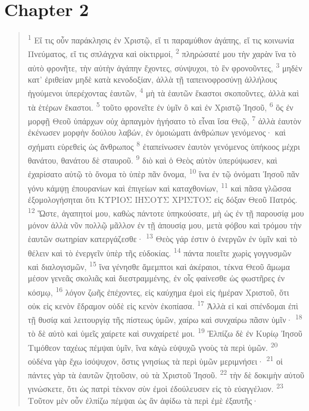 \documentclass{article}
\begin{document}
\section*{Chapter 2}
\begin{verse}
\textsuperscript{1} Εἴ τις οὖν παράκλησις ἐν Χριστῷ, εἴ τι παραμύθιον ἀγάπης, εἴ τις κοινωνία Πνεύματος, εἴ τις σπλάγχνα καὶ οἰκτιρμοί,
\textsuperscript{2} πληρώσατέ μου τὴν χαρὰν ἵνα τὸ αὐτὸ φρονῆτε, τὴν αὐτὴν ἀγάπην ἔχοντες, σύνψυχοι, τὸ ἓν φρονοῦντες,
\textsuperscript{3} μηδὲν κατ’ ἐριθείαν μηδὲ κατὰ κενοδοξίαν, ἀλλὰ τῇ ταπεινοφροσύνῃ ἀλλήλους ἡγούμενοι ὑπερέχοντας ἑαυτῶν,
\textsuperscript{4} μὴ τὰ ἑαυτῶν ἕκαστοι σκοποῦντες, ἀλλὰ καὶ τὰ ἑτέρων ἕκαστοι.
\textsuperscript{5} τοῦτο φρονεῖτε ἐν ὑμῖν ὃ καὶ ἐν Χριστῷ Ἰησοῦ,
\textsuperscript{6} ὃς ἐν μορφῇ Θεοῦ ὑπάρχων οὐχ ἁρπαγμὸν ἡγήσατο τὸ εἶναι ἴσα Θεῷ,
\textsuperscript{7} ἀλλὰ ἑαυτὸν ἐκένωσεν μορφὴν δούλου λαβών, ἐν ὁμοιώματι ἀνθρώπων γενόμενος· καὶ σχήματι εὑρεθεὶς ὡς ἄνθρωπος
\textsuperscript{8} ἐταπείνωσεν ἑαυτὸν γενόμενος ὑπήκοος μέχρι θανάτου, θανάτου δὲ σταυροῦ.
\textsuperscript{9} διὸ καὶ ὁ Θεὸς αὐτὸν ὑπερύψωσεν, καὶ ἐχαρίσατο αὐτῷ τὸ ὄνομα τὸ ὑπὲρ πᾶν ὄνομα,
\textsuperscript{10} ἵνα ἐν τῷ ὀνόματι Ἰησοῦ πᾶν γόνυ κάμψῃ ἐπουρανίων καὶ ἐπιγείων καὶ καταχθονίων,
\textsuperscript{11} καὶ πᾶσα γλῶσσα ἐξομολογήσηται ὅτι ΚΥΡΙΟΣ ΙΗΣΟΥΣ ΧΡΙΣΤΟΣ εἰς δόξαν Θεοῦ Πατρός.
\textsuperscript{12} Ὥστε, ἀγαπητοί μου, καθὼς πάντοτε ὑπηκούσατε, μὴ ὡς ἐν τῇ παρουσίᾳ μου μόνον ἀλλὰ νῦν πολλῷ μᾶλλον ἐν τῇ ἀπουσίᾳ μου, μετὰ φόβου καὶ τρόμου τὴν ἑαυτῶν σωτηρίαν κατεργάζεσθε·
\textsuperscript{13} Θεὸς γάρ ἐστιν ὁ ἐνεργῶν ἐν ὑμῖν καὶ τὸ θέλειν καὶ τὸ ἐνεργεῖν ὑπὲρ τῆς εὐδοκίας.
\textsuperscript{14} πάντα ποιεῖτε χωρὶς γογγυσμῶν καὶ διαλογισμῶν,
\textsuperscript{15} ἵνα γένησθε ἄμεμπτοι καὶ ἀκέραιοι, τέκνα Θεοῦ ἄμωμα μέσον γενεᾶς σκολιᾶς καὶ διεστραμμένης, ἐν οἷς φαίνεσθε ὡς φωστῆρες ἐν κόσμῳ,
\textsuperscript{16} λόγον ζωῆς ἐπέχοντες, εἰς καύχημα ἐμοὶ εἰς ἡμέραν Χριστοῦ, ὅτι οὐκ εἰς κενὸν ἔδραμον οὐδὲ εἰς κενὸν ἐκοπίασα.
\textsuperscript{17} Ἀλλὰ εἰ καὶ σπένδομαι ἐπὶ τῇ θυσίᾳ καὶ λειτουργίᾳ τῆς πίστεως ὑμῶν, χαίρω καὶ συνχαίρω πᾶσιν ὑμῖν·
\textsuperscript{18} τὸ δὲ αὐτὸ καὶ ὑμεῖς χαίρετε καὶ συνχαίρετέ μοι.
\textsuperscript{19} Ἐλπίζω δὲ ἐν Κυρίῳ Ἰησοῦ Τιμόθεον ταχέως πέμψαι ὑμῖν, ἵνα κἀγὼ εὐψυχῶ γνοὺς τὰ περὶ ὑμῶν.
\textsuperscript{20} οὐδένα γὰρ ἔχω ἰσόψυχον, ὅστις γνησίως τὰ περὶ ὑμῶν μεριμνήσει·
\textsuperscript{21} οἱ πάντες γὰρ τὰ ἑαυτῶν ζητοῦσιν, οὐ τὰ Χριστοῦ Ἰησοῦ.
\textsuperscript{22} τὴν δὲ δοκιμὴν αὐτοῦ γινώσκετε, ὅτι ὡς πατρὶ τέκνον σὺν ἐμοὶ ἐδούλευσεν εἰς τὸ εὐαγγέλιον.
\textsuperscript{23} Τοῦτον μὲν οὖν ἐλπίζω πέμψαι ὡς ἂν ἀφίδω τὰ περὶ ἐμὲ ἐξαυτῆς·

\end{verse}
\end{document}
